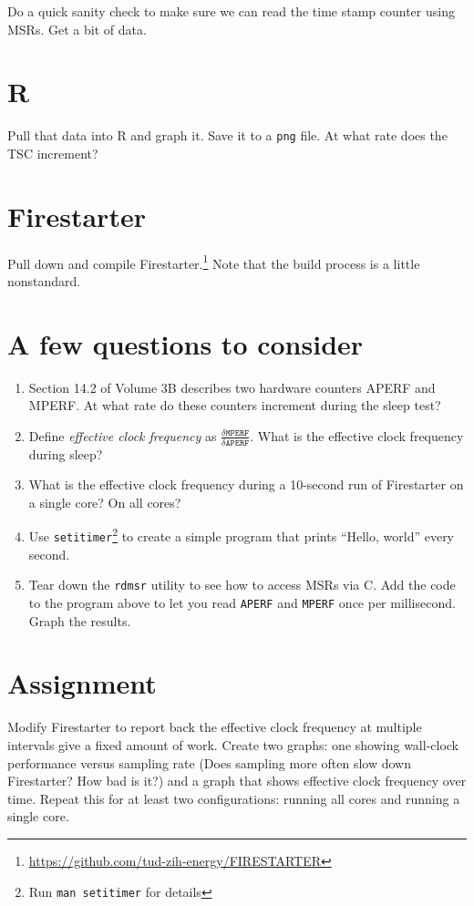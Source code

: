 \documentclass{tufte-handout}
\begin{document}
Do a quick sanity check to make sure we can read the time stamp counter using MSRs.  Get a bit of data.

\section{R}

Pull that data into R and graph it.  Save it to a \texttt{png} file.  At what rate does the TSC increment?

\section{Firestarter}

Pull down and compile Firestarter.\footnote{\url{https://github.com/tud-zih-energy/FIRESTARTER}}  
Note that the build process is a little nonstandard. 


\section{A few questions to consider}
\begin{enumerate}
	\item Section 14.2 of Volume 3B describes two hardware counters APERF and MPERF.  At what rate do these counters increment during the sleep test?
	\item Define \textit{effective clock frequency} as $\frac{\delta\texttt{MPERF}}{\delta\texttt{APERF}}$. What is the effective clock frequency during sleep?
	\item What is the effective clock frequency during a 10-second run of Firestarter on a single core?  On all cores?
	\item Use \texttt{setitimer}\footnote{Run \texttt{man setitimer} for details} to create a simple program that prints ``Hello, world'' every second.
	\item Tear down the \texttt{rdmsr} utility to see how to access MSRs via C.  Add the code to the program above to let you read \texttt{APERF} and \texttt{MPERF} once per millisecond.  Graph the results.
\end{enumerate}

\section{Assignment}
Modify Firestarter to report back the effective clock frequency at multiple intervals give a fixed amount of work.  Create two graphs:  one showing wall-clock performance versus sampling rate (Does sampling more often slow down Firestarter?  How bad is it?) and a graph that shows effective clock frequency over time.  Repeat this for at least two configurations:  running all cores and running a single core.
\end{document}
